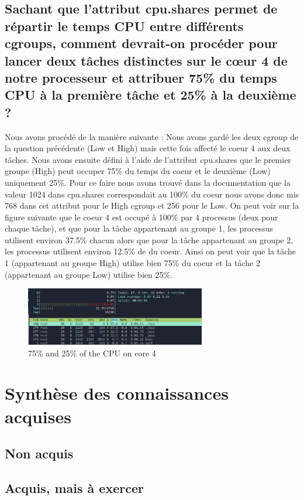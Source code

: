 \documentclass{ReportTemplate}
\begin{document}
\subsection{Sachant que l’attribut cpu.shares permet de répartir le temps CPU entre différents cgroups, comment devrait-on procéder pour lancer deux tâches distinctes sur le cœur 4 de notre processeur et attribuer 75\% du temps CPU à la première tâche et 25\% à la deuxième ?}
Nous avons procédé de la manière suivante : \newline
Nous avons gardé les deux cgroup de la question précédente (Low et High) mais
cette fois affecté le coeur 4 aux deux tâches. Nous avons ensuite défini à
l'aide de l'attribut cpu.shares que le premier groupe (High) peut occuper 75\% du temps
du coeur et le deuxième (Low) uniquement 25\%.
Pour ce faire nous avons trouvé dans la documentation que la valeur 1024 dans
cpu.shares correspondait au 100\% du coeur nous avons donc mis 768 dans cet
attribut pour le High cgroup et 256 pour le Low. On peut voir sur la figure
suivante que le coeur 4 est occupé à 100\% par 4 processus (deux pour chaque
tâche), et que pour la tâche appartenant au groupe 1, les processus utilisent
environ 37.5\% chacun alors que pour la tâche appartenant au groupe 2, les
processus utilisent environ 12.5\% de du coeur. Ainsi on peut voir que la tâche
1 (appartenant au groupe High) utilise bien 75\% du coeur et la tâche 2
(appartenant au groupe Low) utilise bien 25\%.
\begin{figure}[H]
    \centering
    \includegraphics[width=0.7\textwidth]{imageSources/75x25Use.png}
    \caption{75\% and 25\% of the CPU on core 4}
    \label{fig:LowHighGroup2}
\end{figure}
\section{Synthèse des connaissances acquises}
\subsection{Non acquis}

\subsection{Acquis, mais à exercer}
\end{document}

